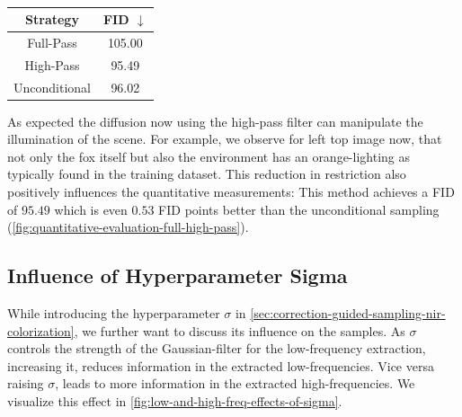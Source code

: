 \begin{table}[htp!]
    \centering
    \begin{tabular}{c | c}
        Strategy      & FID  $\downarrow$ \\
        \hline\hline
        Full-Pass     & 105.00            \\
        High-Pass     & 95.49             \\
        Unconditional & 96.02
    \end{tabular}
    \caption{
    }
    \label{fig:quantitative-evaluation-full-high-pass}
\end{table}


As expected the diffusion now using the high-pass filter can manipulate the illumination of the scene.
For example, we observe for left top image now, that not only the fox itself but also the environment has an orange-lighting as typically found in the training dataset.
This reduction in restriction also positively influences the quantitative measurements:
This method achieves a FID of $95.49$ which is even $0.53$ FID points better than the unconditional sampling (\autoref{fig:quantitative-evaluation-full-high-pass}).



\subsection{Influence of Hyperparameter Sigma}
\label{sec:influence-of-sigma-evaluation}

While introducing the hyperparameter $\sigma$ in \autoref{sec:correction-guided-sampling-nir-colorization}, we further want to discuss its influence on the samples.
As $\sigma$ controls the strength of the Gaussian-filter for the low-frequency extraction, increasing it, reduces information in the extracted low-frequencies.
Vice versa raising $\sigma$, leads to more information in the extracted high-frequencies.
We visualize this effect in \autoref{fig:low-and-high-freq-effects-of-sigma}.


